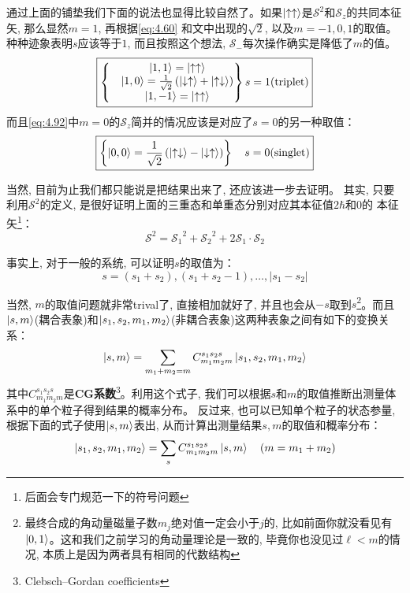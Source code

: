 \documentclass[a4paper,zihao=-4,linespread=1]{ctexrep}
\begin{document}
    通过上面的铺垫我们下面的说法也显得比较自然了。如果$\ket{\uparrow\uparrow}$是$\mathcal{S}^2$和$\mathcal{S}_z$的共同本征矢, 那么显然$m=1$, 再根据\ref{eq:4.60}
    和文中出现的$\sqrt{2}$, 以及$m=-1,0,1$的取值。种种迹象表明$s$应该等于$1$, 而且按照这个想法, $\mathcal{S}_-$每次操作确实是降低了$m$的值。
    \begin{equation}
        \boxed{
            \left\{
                \begin{matrix}
                   &\ket{1,1}=\ket{\uparrow\uparrow}\\
                    &\ket{1,0}=\frac{1}{\sqrt{2}}\left(\ket{\downarrow\uparrow}+\ket{\uparrow\downarrow}\right)\\
                    &\ket{1,-1}=\ket{\uparrow\uparrow} 
                \end{matrix}
            \right\}s=1\text{(triplet)}
        }
    \end{equation}
    而且\ref{eq:4.92}中$m=0$的$\mathcal{S}_z$简并的情况应该是对应了$s=0$的另一种取值：
    \begin{equation}
        \boxed{
            \left\{\ket{0,0}=\frac{1}{\sqrt{2}}\left(\ket{\uparrow\downarrow}-\ket{\downarrow\uparrow}\right)\right\}\quad s=0\text{(singlet)}
        }
    \end{equation}

    当然, 目前为止我们都只能说是把结果出来了, 还应该进一步去证明。 其实, 只要利用$\mathcal{S}^2$的定义, 是很好证明上面的三重态和单重态分别对应其本征值$2\hbar$和$0$的
    本征矢\footnote{后面会专门规范一下的符号问题}：
    \[\mathcal{S}^2={\mathcal{S}_1}^2+{\mathcal{S}_2}^2+2\mathcal{S}_1\cdot\mathcal{S}_2\]
    

    事实上, 对于一般的系统, 可以证明$s$的取值为：
    \begin{equation}
        \boxed{s=(s_1+s_2),(s_1+s_2-1),\ldots,|s_1-s_2|}
    \end{equation}
    
    当然, $m$的取值问题就非常trival了, 直接相加就好了, 并且也会从$-s$取到$s$\footnote{最终合成的角动量磁量子数$m_j$绝对值一定会小于$j$的, 比如前面你就没看见有$\ket{0,1}$。这和我们之前学习的角动量理论是一致的, 毕竟你也没见过$\ell<m$的情况, 本质上是因为两者具有相同的代数结构}。而且$\ket{s,m}$(耦合表象)和$\ket{s_1,s_2,m_1,m_2}$(非耦合表象)这两种表象之间有如下的变换关系：
    \begin{equation}
        \label{eq:4.96}
        \ket{s,m}=\sum_{m_1+m_2=m}C_{m_1m_2m}^{s_1s_2s}\ket{s_1,s_2,m_1,m_2}
    \end{equation}
    其中$C_{m_1m_2m}^{s_1s_2s}$是\textbf{CG系数}\footnote{Clebsch–Gordan coefficients}。利用这个式子, 我们可以根据$s$和$m$的取值推断出测量体系中的单个粒子得到结果的概率分布。
    反过来, 也可以已知单个粒子的状态参量, 根据下面的式子使用$\ket{s,m}$表出, 从而计算出测量结果$s,m$的取值和概率分布：
    \begin{equation}
        \ket{s_1,s_2,m_1,m_2}=\sum_{s}C_{m_1m_2m}^{s_1s_2s}\ket{s,m}\quad (m=m_1+m_2)
    \end{equation}
    
\end{document}
